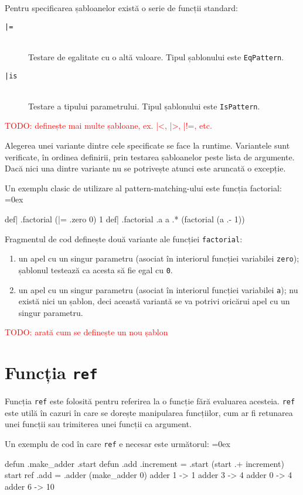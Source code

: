 \documentclass[12pt,a4paper]{memoir}
\newcommand{\draft}{\textcolor{red}}
\renewcommand{\c}{\texttt}
\newenvironment{code}
{
\definecolor{shadecolor}{gray}{0.91}
\topsep=0ex
\relax
\shaded
\verbatim
}
{
\endverbatim
\endshaded
}
\begin{document}
Pentru specificarea șabloanelor există o serie de funcții standard:
\begin{description}
\item[\c{|=}]\hfill\\ Testare de egalitate cu o altă valoare. Tipul șablonului este \c{EqPattern}.
\item[\c{|is}]\hfill\\ Testare a tipului parametrului. Tipul șablonului este \c{IsPattern}.
\end{description}
\draft{TODO: definește mai multe șabloane, ex.  |<, |>, |!=, etc.}

Alegerea unei variante dintre cele specificate se face la runtime. Variantele sunt verificate, în ordinea definirii, prin testarea șabloanelor peste lista de argumente. Dacă nici una dintre variante nu se potrivește atunci este aruncată o excepție.

Un exemplu clasic de utilizare al pattern-matching-ului este funcția factorial:
\begin{code}
def| .factorial (|= .zero 0) { 1 }
def| .factorial .a { a .* (factorial (a .- 1)) }
\end{code}
Fragmentul de cod definește două variante ale funcției \c{factorial}:
\begin{enumerate}
\item un apel cu un singur parametru (asociat în interiorul funcției variabilei \c{zero}); șablonul testează ca acesta să fie egal cu \c{0}.
\item un apel cu un singur parametru (asociat în interiorul funcției variabilei \c{a}); nu există nici un șablon, deci această variantă se va potrivi oricărui apel cu un singur parametru.
\end{enumerate}

\draft{TODO: arată cum se definește un nou șablon}

\section{Funcția \c{ref}}

Funcția \c{ref} este folosită pentru referirea la o funcție fără evaluarea acesteia. \c{ref} este utilă în cazuri în care se dorește manipularea funcțiilor, cum ar fi retunarea unei funcții sau trimiterea unei funcții ca argument. 

Un exemplu de cod în care \c{ref} e necesar este următorul:
\begin{code}
defun .make_adder .start {
  defun .add .increment {
    = .start (start .+ increment)
    start
  }
  ref .add
}
= .adder (make_adder 0)
adder 1 -> 1
adder 3 -> 4
adder 0 -> 4
adder 6 -> 10
\end{code}
\end{document}
